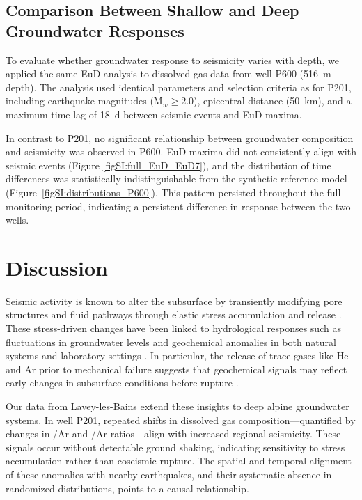 \subsection{Comparison Between Shallow and Deep Groundwater Responses}
To evaluate whether groundwater response to seismicity varies with depth, we applied the same EuD analysis to dissolved gas data from well P600 (\SI{516}{\metre} depth).
The analysis used identical parameters and selection criteria as for P201, including earthquake magnitudes (M$_w \geq 2.0$), epicentral distance (\SI{50}{\kilo\meter}), and a maximum time lag of \SI{18}{\day} between seismic events and EuD maxima.

In contrast to P201, no significant relationship between groundwater composition and seismicity was observed in P600.
EuD maxima did not consistently align with seismic events (Figure \ref{figSI:full_EuD_EuD7}), and the distribution of time differences was statistically indistinguishable from the synthetic reference model (Figure~\ref{figSI:distributions_P600}).
This pattern persisted throughout the full monitoring period, indicating a persistent difference in response between the two wells.

\section{Discussion}
Seismic activity is known to alter the subsurface by transiently modifying pore structures and fluid pathways through elastic stress accumulation and release \citep{nakagomi2021stress, liu2024opposite}.
These stress-driven changes have been linked to hydrological responses such as fluctuations in groundwater levels and geochemical anomalies in both natural systems and laboratory settings \citep{rutter2016aquifer, bauer2016release}.
In particular, the release of trace gases like He and Ar prior to mechanical failure suggests that geochemical signals may reflect early changes in subsurface conditions before rupture \citep{roques2020helium}.

Our data from Lavey-les-Bains extend these insights to deep alpine groundwater systems.
In well P201, repeated shifts in dissolved gas composition---quantified by changes in /Ar and /Ar ratios---align with increased regional seismicity.
These signals occur without detectable ground shaking, indicating sensitivity to stress accumulation rather than coseismic rupture.
The spatial and temporal alignment of these anomalies with nearby earthquakes, and their systematic absence in randomized distributions, points to a causal relationship.

